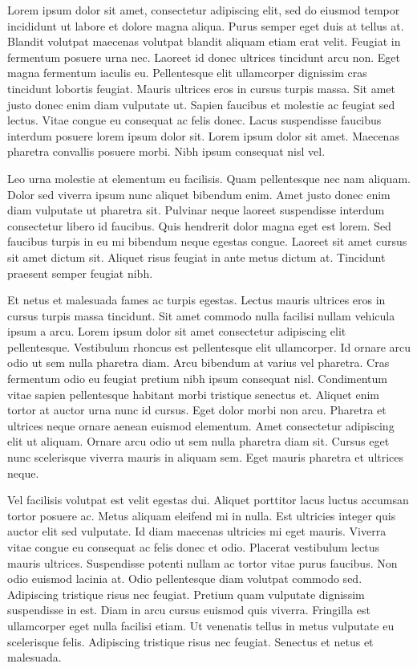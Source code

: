 \documentclass{article}
\begin{document}
Lorem ipsum dolor sit amet, consectetur adipiscing elit, sed do eiusmod
tempor incididunt ut labore et dolore magna aliqua. Purus semper eget
duis at tellus at. Blandit volutpat maecenas volutpat blandit aliquam
etiam erat velit. Feugiat in fermentum posuere urna nec. Laoreet id donec
ultrices tincidunt arcu non. Eget magna fermentum iaculis eu. Pellentesque
elit ullamcorper dignissim cras tincidunt lobortis feugiat. Mauris
ultrices eros in cursus turpis massa. Sit amet justo donec enim diam
vulputate ut. Sapien faucibus et molestie ac feugiat sed lectus. Vitae
congue eu consequat ac felis donec. Lacus suspendisse faucibus interdum
posuere lorem ipsum dolor sit. Lorem ipsum dolor sit amet. Maecenas
pharetra convallis posuere morbi. Nibh ipsum consequat nisl vel.

Leo urna molestie at elementum eu facilisis. Quam pellentesque nec
nam aliquam. Dolor sed viverra ipsum nunc aliquet bibendum enim. Amet
justo donec enim diam vulputate ut pharetra sit. Pulvinar neque laoreet
suspendisse interdum consectetur libero id faucibus. Quis hendrerit
dolor magna eget est lorem. Sed faucibus turpis in eu mi bibendum neque
egestas congue. Laoreet sit amet cursus sit amet dictum sit. Aliquet risus
feugiat in ante metus dictum at. Tincidunt praesent semper feugiat nibh.

\begin{dline}

Et netus et malesuada fames ac turpis egestas. Lectus mauris ultrices
eros in cursus turpis massa tincidunt. Sit amet commodo nulla facilisi
nullam vehicula ipsum a arcu. Lorem ipsum dolor sit amet consectetur
adipiscing elit pellentesque. Vestibulum rhoncus est pellentesque elit
ullamcorper. Id ornare arcu odio ut sem nulla pharetra diam. Arcu bibendum
at varius vel pharetra. Cras fermentum odio eu feugiat pretium nibh
ipsum consequat nisl. Condimentum vitae sapien pellentesque habitant
morbi tristique senectus et. Aliquet enim tortor at auctor urna nunc
id cursus. Eget dolor morbi non arcu. Pharetra et ultrices neque
ornare aenean euismod elementum. Amet consectetur adipiscing elit ut
aliquam. Ornare arcu odio ut sem nulla pharetra diam sit. Cursus eget
nunc scelerisque viverra mauris in aliquam sem. Eget mauris pharetra et
ultrices neque.

Vel facilisis volutpat est velit egestas dui. Aliquet porttitor lacus
luctus accumsan tortor posuere ac. Metus aliquam eleifend mi in nulla. Est
ultricies integer quis auctor elit sed vulputate. Id diam maecenas
ultricies mi eget mauris. Viverra vitae congue eu consequat ac felis donec
et odio. Placerat vestibulum lectus mauris ultrices. Suspendisse potenti
nullam ac tortor vitae purus faucibus. Non odio euismod lacinia at. Odio
pellentesque diam volutpat commodo sed. Adipiscing tristique risus nec
feugiat. Pretium quam vulputate dignissim suspendisse in est. Diam in
arcu cursus euismod quis viverra. Fringilla est ullamcorper eget nulla
facilisi etiam. Ut venenatis tellus in metus vulputate eu scelerisque
felis. Adipiscing tristique risus nec feugiat. Senectus et netus et
malesuada.

\end{dline}
\end{document}
